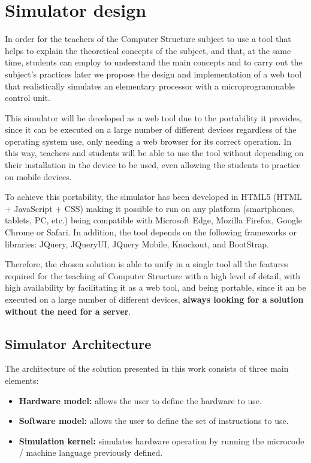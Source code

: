 \section*{Simulator design}

In order for the teachers of the Computer Structure subject to use a tool that helps to explain the theoretical concepts of the subject, and that, at the same time, students can employ to understand the main concepts and to carry out the subject's practices later we propose the design and implementation of a web tool that realistically simulates an elementary processor with a microprogrammable control unit.

This simulator will be developed as a web tool due to the portability it provides, since it can be executed on a large number of different devices regardless of the operating system use, only needing a web browser for its correct operation. In this way, teachers and students will be able to use the tool without depending on their installation in the device to be used, even allowing the students to practice on mobile devices.

To achieve this portability, the simulator has been developed in HTML5 (HTML + JavaScript + CSS) making it possible to run on any platform (smartphones, tablets, PC, etc.) being compatible with Microsoft Edge, Mozilla Firefox, Google Chrome or Safari. In addition, the tool depends on the following frameworks or libraries: JQuery, JQueryUI, JQuery Mobile, Knockout, and BootStrap.

Therefore, the chosen solution is able to unify in a single tool all the features required for the teaching of Computer Structure with a high level of detail, with high availability by facilitating it as a web tool, and being portable, since it an be executed on a large number of different devices, \textbf{always looking for a solution without the need for a server}.

\subsection*{Simulator Architecture}

The architecture of the solution presented in this work consists of three main elements:

\begin{itemize}
\item \textbf{Hardware model:} allows the user to define the hardware to use.
\item \textbf{Software model:} allows the user to define the set of instructions to use.
\item \textbf{Simulation kernel:} simulates hardware operation by running the microcode / machine language previously defined.
\end{itemize}

